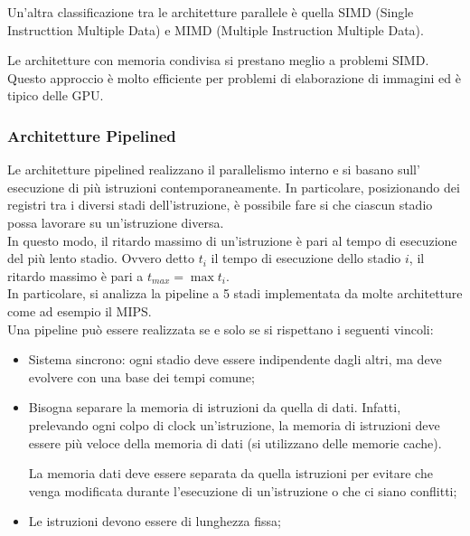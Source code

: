 \documentclass{article}
\begin{document}
Un'altra classificazione tra le architetture parallele è quella SIMD (Single 
Instructtion Multiple Data) e MIMD (Multiple Instruction Multiple Data).

Le architetture con memoria condivisa si prestano meglio a problemi SIMD.
Questo approccio è molto efficiente per problemi di elaborazione di immagini
ed è tipico delle GPU.

\subsubsection{Architetture Pipelined}
Le architetture pipelined realizzano il parallelismo interno e si basano sull' 
esecuzione di più istruzioni contemporaneamente. In particolare, posizionando 
dei registri tra i diversi stadi dell'istruzione, è possibile fare si che
ciascun stadio possa lavorare su un'istruzione diversa.\\ 
In questo modo, il ritardo massimo di un'istruzione è pari al tempo di
esecuzione del più lento stadio. Ovvero detto $t_i$ il tempo di esecuzione dello 
stadio $i$, il ritardo massimo è pari a $t_{max} = \max t_i$.\\ 

In particolare, si analizza la pipeline a 5 stadi implementata da molte 
architetture come ad esempio il MIPS.\\
Una pipeline può essere realizzata se e solo se si rispettano i seguenti 
vincoli:

\begin{itemize}
  \item Sistema sincrono: ogni stadio deve essere indipendente dagli altri, ma 
    deve evolvere con una base dei tempi comune;
  \item Bisogna separare la memoria di istruzioni da quella di dati. Infatti, 
    prelevando ogni colpo di clock un'istruzione, la memoria di istruzioni deve
    essere più veloce della memoria di dati (si utilizzano delle memorie cache).

    La memoria dati deve essere separata da quella istruzioni per evitare che 
    venga modificata durante l'esecuzione di un'istruzione o che ci siano 
    conflitti;
  \item Le istruzioni devono essere di lunghezza fissa;
\end{itemize} 
\end{document}
